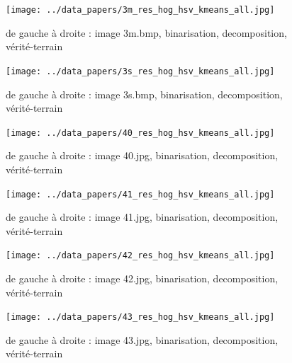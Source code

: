 \documentclass{book}
\begin{document}
\begin{figure}[H]
\begin{center}
\texttt{[image: ../data\_papers/3m\_res\_hog\_hsv\_kmeans\_all.jpg]}
\end{center}
\caption{de gauche à droite : image 3m.bmp, binarisation, decomposition, vérité-terrain}
\label{3m}
\end{figure}
\clearpage


\begin{figure}[H]
\begin{center}
\texttt{[image: ../data\_papers/3s\_res\_hog\_hsv\_kmeans\_all.jpg]}
\end{center}
\caption{de gauche à droite : image 3s.bmp, binarisation, decomposition, vérité-terrain}
\label{3s}
\end{figure}
\clearpage


\begin{figure}[H]
\begin{center}
\texttt{[image: ../data\_papers/40\_res\_hog\_hsv\_kmeans\_all.jpg]}
\end{center}
\caption{de gauche à droite : image 40.jpg, binarisation, decomposition, vérité-terrain}
\label{40}
\end{figure}
\clearpage


\begin{figure}[H]
\begin{center}
\texttt{[image: ../data\_papers/41\_res\_hog\_hsv\_kmeans\_all.jpg]}
\end{center}
\caption{de gauche à droite : image 41.jpg, binarisation, decomposition, vérité-terrain}
\label{41}
\end{figure}
\clearpage


\begin{figure}[H]
\begin{center}
\texttt{[image: ../data\_papers/42\_res\_hog\_hsv\_kmeans\_all.jpg]}
\end{center}
\caption{de gauche à droite : image 42.jpg, binarisation, decomposition, vérité-terrain}
\label{42}
\end{figure}
\clearpage


\begin{figure}[H]
\begin{center}
\texttt{[image: ../data\_papers/43\_res\_hog\_hsv\_kmeans\_all.jpg]}
\end{center}
\caption{de gauche à droite : image 43.jpg, binarisation, decomposition, vérité-terrain}
\label{43}
\end{figure}
\clearpage
\end{document}
